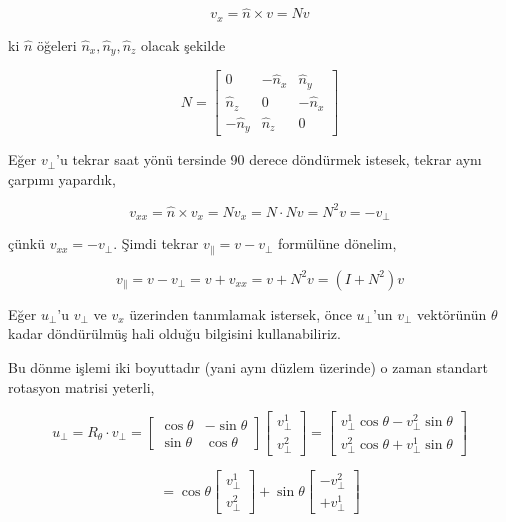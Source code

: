 \documentclass[12pt,fleqn]{article}\usepackage{../../common}
\begin{document}
$$ v_x = \hat{n} \times v = Nv $$

ki $\hat{n}$ öğeleri $\hat{n}_x,\hat{n}_y,\hat{n}_z$ olacak şekilde

$$ 
N = \left[\begin{array}{rrr}
0 & -\hat{n}_x  & \hat{n}_y \\
\hat{n}_z & 0 & -\hat{n}_x \\
-\hat{n}_y & \hat{n}_z & 0
\end{array}\right]
 $$

Eğer $v_\perp$'u tekrar saat yönü tersinde 90 derece döndürmek istesek,
tekrar aynı çarpımı yapardık,

$$ v_{xx} = \hat{n} \times v_x =  N  v_x = N \cdot N v = N^2v = -v_\perp
$$

çünkü $v_{xx} = -v_\perp$. Şimdi tekrar $v_\parallel = v - v_\perp$ formülüne dönelim,

$$ v_\parallel = v - v_\perp = v + v_{xx} = v + N^2v  = (I+N^2)v $$

Eğer $u_\perp$'u $v_\perp$ ve $v_x$ üzerinden tanımlamak istersek, önce $u_\perp$'un $v_\perp$ 
vektörünün $\theta$ kadar döndürülmüş hali olduğu bilgisini kullanabiliriz. 

Bu dönme işlemi iki boyuttadır (yani aynı düzlem üzerinde) o zaman standart
rotasyon matrisi yeterli,

$$ 
u_\perp = R_\theta \cdot v_\perp = 
\left[\begin{array}{rrr}
\cos \theta & -\sin \theta \\
\sin \theta & \cos \theta
\end{array}\right]
\left[\begin{array}{rrr}
v_\perp^1 \\
v_\perp^2
\end{array}\right] = 
\left[\begin{array}{rrr}
v_\perp^1 \cos \theta  - v_\perp^2 \sin \theta \\
v_\perp^2 \cos \theta  + v_\perp^1 \sin \theta  
\end{array}\right]
$$

$$ =
\cos \theta
\left[\begin{array}{rrr}
v_\perp^1  \\
v_\perp^2   
\end{array}\right] 
+ 
\sin \theta
\left[\begin{array}{rrr}
 - v_\perp^2  \\
 + v_\perp^1  
\end{array}\right] 
$$
\end{document}

